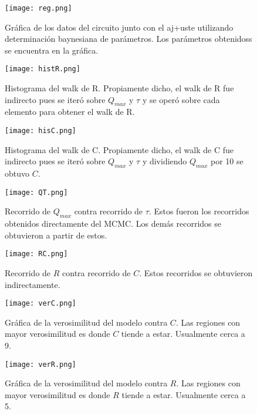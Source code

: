 ﻿\documentclass[notitlepage,letterpaper,12pt]{article} %
\begin{document}
\begin{figure}[h!]
  \centering
   \texttt{[image: reg.png]}
  \caption{Gráfica de los datos del circuito junto con el aj+uste utilizando determinación baynesiana de parámetros. Los parámetros obtenidoss se encuentra en la gráfica. }
  \label{reg}
\end{figure}

\begin{figure}[h!]
  \centering
   \texttt{[image: histR.png]}
  \caption{Histograma del walk de R. Propiamente dicho, el walk de R fue indirecto pues se iteró sobre $Q_{max}$ y $\tau$ y se operó sobre cada elemento para obtener el walk de  R.}
  \label{histR}
\end{figure}

\begin{figure}[h!]
  \centering
   \texttt{[image: hisC.png]}
  \caption{Histograma del walk de C. Propiamente dicho, el walk de C fue indirecto pues se iteró sobre $Q_{max}$ y $\tau$ y dividiendo $Q_{max}$ por 10 se obtuvo $C$. }
  \label{hisC}
\end{figure}

\begin{figure}[h!]
  \centering
   \texttt{[image: QT.png]}
  \caption{Recorrido de $Q_{max}$ contra recorrido de $\tau$. Estos fueron los recorridos obtenidos directamente del MCMC. Los demás recorridos se obtuvieron a partir de estos.}
  \label{QT}
\end{figure}

\begin{figure}[h!]
  \centering
   \texttt{[image: RC.png]}
  \caption{Recorrido de $R$ contra recorrido de $C$. Estos recorridos se obtuvieron indirectamente.}
  \label{RC}
\end{figure}

\begin{figure}[h!]
  \centering
   \texttt{[image: verC.png]}
  \caption{Gráfica de la verosimilitud del modelo contra $C$. Las regiones con mayor verosimilitud es donde $C$ tiende a estar. Usualmente cerca a 9.}
  \label{verC}
\end{figure}

\begin{figure}[h!]
  \centering
   \texttt{[image: verR.png]}
  \caption{Gráfica de la verosimilitud del modelo contra $R$. Las regiones con mayor verosimilitud es donde $R$ tiende a estar. Usualmente cerca a 5.}
  \label{verR}
\end{figure}
\end{document}
